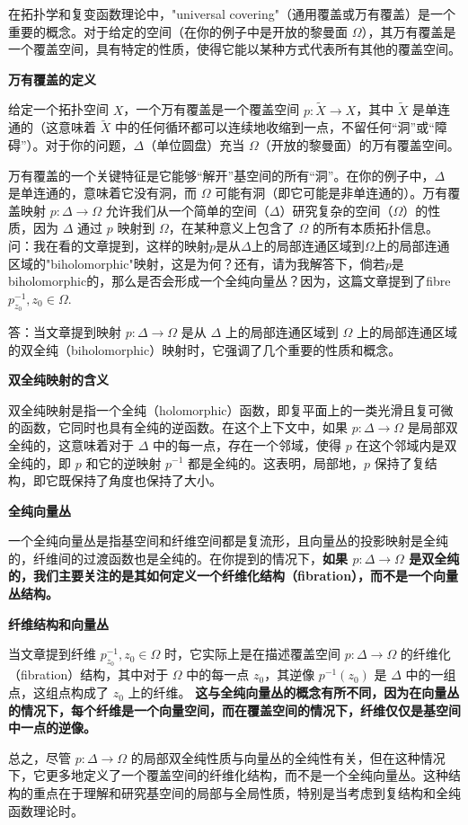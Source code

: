 \begin{proposition}[][疑难解答]
  在拓扑学和复变函数理论中，"universal covering"（通用覆盖或万有覆盖）是一个重要的概念。对于给定的空间（在你的例子中是开放的黎曼面 $\Omega$），其万有覆盖是一个覆盖空间，具有特定的性质，使得它能以某种方式代表所有其他的覆盖空间。

\textbf{万有覆盖的定义}

给定一个拓扑空间 $X$，一个万有覆盖是一个覆盖空间 $p\colon \widetilde{X} \to X$，其中 $\widetilde{X}$ 是单连通的（这意味着 $\widetilde{X}$ 中的任何循环都可以连续地收缩到一点，不留任何“洞”或“障碍”）。对于你的问题，$\Delta$（单位圆盘）充当 $\Omega$（开放的黎曼面）的万有覆盖空间。

万有覆盖的一个关键特征是它能够“解开”基空间的所有“洞”。在你的例子中，$\Delta$ 是单连通的，意味着它没有洞，而 $\Omega$ 可能有洞（即它可能是非单连通的）。万有覆盖映射 $p\colon \Delta \to \Omega$ 允许我们从一个简单的空间（$\Delta$）研究复杂的空间（$\Omega$）的性质，因为 $\Delta$ 通过 $p$ 映射到 $\Omega$，在某种意义上包含了 $\Omega$ 的所有本质拓扑信息。
\tcblower
  问：我在看的文章提到，这样的映射$p$是从$\Delta$上的局部连通区域到$\Omega$上的局部连通区域的"biholomorphic"映射，这是为何？还有，请为我解答下，倘若$p$是biholomorphic的，那么是否会形成一个全纯向量丛？因为，这篇文章提到了fibre $p^{-1}_{z_0}, z_0\in \Omega$.

  答：当文章提到映射 $p\colon \Delta \to \Omega$ 是从 $\Delta$ 上的局部连通区域到 $\Omega$ 上的局部连通区域的双全纯（biholomorphic）映射时，它强调了几个重要的性质和概念。

\textbf{ 双全纯映射的含义}

双全纯映射是指一个全纯（holomorphic）函数，即复平面上的一类光滑且复可微的函数，它同时也具有全纯的逆函数。在这个上下文中，如果 $p\colon \Delta \to \Omega$ 是局部双全纯的，这意味着对于 $\Delta$ 中的每一点，存在一个邻域，使得 $p$ 在这个邻域内是双全纯的，即 $p$ 和它的逆映射 $p^{-1}$ 都是全纯的。这表明，局部地，$p$ 保持了复结构，即它既保持了角度也保持了大小。

\textbf{ 全纯向量丛}

一个全纯向量丛是指基空间和纤维空间都是复流形，且向量丛的投影映射是全纯的，纤维间的过渡函数也是全纯的。在你提到的情况下，\textbf{如果 $p\colon \Delta \to \Omega$ 是双全纯的，我们主要关注的是其如何定义一个纤维化结构（fibration），而不是一个向量丛结构。}

\textbf{ 纤维结构和向量丛}

当文章提到纤维 $p^{-1}_{z_0}, z_0\in \Omega$ 时，它实际上是在描述覆盖空间 $p\colon \Delta \to \Omega$ 的纤维化（fibration）结构，其中对于 $\Omega$ 中的每一点 $z_0$，其逆像 $p^{-1}(z_0)$ 是 $\Delta$ 中的一组点，这组点构成了 $z_0$ 上的纤维。\textbf{\color{purple} 这与全纯向量丛的概念有所不同，因为在向量丛的情况下，每个纤维是一个向量空间，而在覆盖空间的情况下，纤维仅仅是基空间中一点的逆像。}

总之，尽管 $p\colon \Delta \to \Omega$ 的局部双全纯性质与向量丛的全纯性有关，但在这种情况下，它更多地定义了一个覆盖空间的纤维化结构，而不是一个全纯向量丛。这种结构的重点在于理解和研究基空间的局部与全局性质，特别是当考虑到复结构和全纯函数理论时。
\end{proposition}
  
